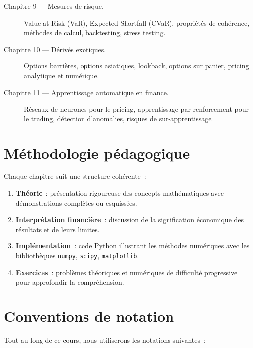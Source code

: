 \begin{description}
    \item[Chapitre 9 --- Mesures de risque.]
        Value-at-Risk (VaR), Expected Shortfall (CVaR), propri\'et\'es
        de coh\'erence, m\'ethodes de calcul, backtesting, stress testing.

    \item[Chapitre 10 --- D\'eriv\'es exotiques.]
        Options barri\`eres, options asiatiques, lookback, options sur
        panier, pricing analytique et num\'erique.

    \item[Chapitre 11 --- Apprentissage automatique en finance.]
        R\'eseaux de neurones pour le pricing, apprentissage par renforcement
        pour le trading, d\'etection d'anomalies, risques de sur-apprentissage.
\end{description}

\section*{M\'ethodologie p\'edagogique}

Chaque chapitre suit une structure coh\'erente~:

\begin{enumerate}
    \item \textbf{Th\'eorie}~: pr\'esentation rigoureuse des concepts
          math\'ematiques avec d\'emonstrations compl\`etes ou esquiss\'ees.
    \item \textbf{Interpr\'etation financi\`ere}~: discussion de la
          signification \'economique des r\'esultats et de leurs limites.
    \item \textbf{Impl\'ementation}~: code Python illustrant les m\'ethodes
          num\'eriques avec les biblioth\`eques \texttt{numpy},
          \texttt{scipy}, \texttt{matplotlib}.
    \item \textbf{Exercices}~: probl\`emes th\'eoriques et num\'eriques
          de difficult\'e progressive pour approfondir la compr\'ehension.
\end{enumerate}

\section*{Conventions de notation}

Tout au long de ce cours, nous utiliserons les notations suivantes~:

